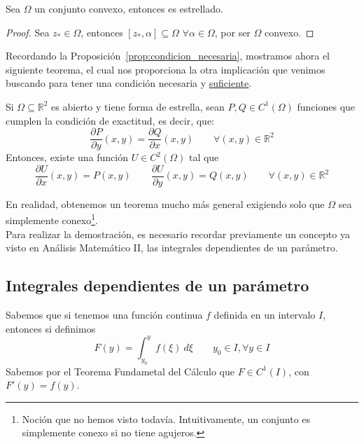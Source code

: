 \begin{prop}
    Sea $\Omega$ un conjunto convexo, entonces es estrellado.
    \begin{proof}
        Sea $z_\ast \in \Omega$, entonces $[z_\ast, \alpha]\subseteq \Omega$ $\forall \alpha\in \Omega$, por ser $\Omega$ convexo.
    \end{proof}
\end{prop}

\noindent
Recordando la Proposición~\ref{prop:condicion_necesaria}, mostramos ahora el siguiente teorema, el cual nos proporciona la otra implicación que venimos buscando para tener una condición necesaria y \underline{suficiente}.
\begin{teo}\label{teo:condicion_suficiente}
    Si $\Omega\subseteq \mathbb{R}^2$ es abierto y tiene forma de estrella, sean $P,Q\in C^1(\Omega)$ funciones que cumplen la condición de exactitud, es decir, que:
    \begin{equation*}
        \dfrac{\partial P}{\partial y}(x,y) = \dfrac{\partial Q}{\partial x}(x,y) \qquad \forall (x,y)\in \mathbb{R}^2
    \end{equation*}
    Entonces, existe una función $U\in C^2(\Omega)$ tal que 
    \begin{equation*}
        \dfrac{\partial U}{\partial x}(x,y) = P(x,y) \qquad \dfrac{\partial U}{\partial y}(x,y) = Q(x,y) \qquad \forall (x,y)\in \mathbb{R}^2
    \end{equation*}
\end{teo}
\noindent
En realidad, obtenemos un teorema mucho más general exigiendo solo que $\Omega$ sea simplemente conexo\footnote{Noción que no hemos visto todavía. Intuitivamente, un conjunto es simplemente conexo si no tiene agujeros.}.\\

Para realizar la demostración, es necesario recordar previamente un concepto ya visto en Análisis Matemático II\@, las integrales dependientes de un parámetro.
\subsection{Integrales dependientes de un parámetro}
Sabemos que si tenemos una función continua $f$ definida en un intervalo $I$, entonces si definimos
\begin{equation*}
    F(y) = \int_{y_0}^{y} f(\xi)~d\xi  \qquad y_0\in I, \forall y\in I
\end{equation*}
Sabemos por el Teorema Fundametal del Cálculo que $F\in C^1(I)$, con $F'(y) = f(y)$.\\

